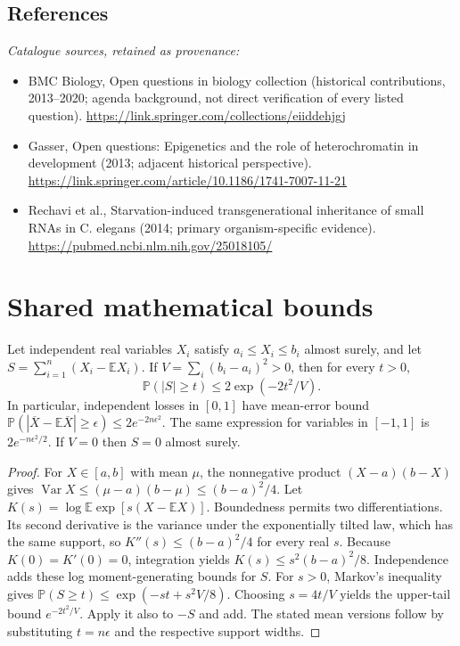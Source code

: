\documentclass[11pt]{article}
\begin{document}
\subsection{References}
\noindent\emph{Catalogue sources, retained as provenance:}
\begin{itemize}
\item BMC Biology, Open questions in biology collection (historical contributions, 2013--2020; agenda background, not direct verification of every listed question). \url{https://link.springer.com/collections/eiiddehjgj}
\item Gasser, Open questions: Epigenetics and the role of heterochromatin in development (2013; adjacent historical perspective). \url{https://link.springer.com/article/10.1186/1741-7007-11-21}
\item Rechavi et al., Starvation-induced transgenerational inheritance of small RNAs in C. elegans (2014; primary organism-specific evidence). \url{https://pubmed.ncbi.nlm.nih.gov/25018105/}
\end{itemize}




\section{Shared mathematical bounds}\label{app:bounds}
\begin{lemma}\label{lem:bounded}
Let independent real variables $X_i$ satisfy $a_i\leq X_i\leq b_i$ almost surely,
and let $S=\sum_{i=1}^n(X_i-\mathbb{E} X_i)$. If
$V=\sum_i(b_i-a_i)^2>0$, then for every $t>0$,
\[
 \mathbb{P}(|S|\geq t)\leq 2\exp(-2t^2/V).
\]
In particular, independent losses in $[0,1]$ have mean-error bound
$\mathbb{P}(|\overline X-\mathbb{E}\overline X|\geq\epsilon)
\leq2e^{-2n\epsilon^2}$. The same expression for variables in $[-1,1]$
is $2e^{-n\epsilon^2/2}$. If $V=0$ then $S=0$ almost surely.
\end{lemma}
\begin{proof}
For $X\in[a,b]$ with mean $\mu$, the nonnegative product
$(X-a)(b-X)$ gives
$\operatorname{Var} X\leq(\mu-a)(b-\mu)\leq(b-a)^2/4$.
Let $K(s)=\log\mathbb{E}\exp[s(X-\mathbb{E} X)]$.
Boundedness permits two differentiations. Its second derivative is the variance
under the exponentially tilted law, which has the same support, so
$K''(s)\leq(b-a)^2/4$ for every real $s$.
Because $K(0)=K'(0)=0$, integration yields
$K(s)\leq s^2(b-a)^2/8$.
Independence adds these log moment-generating bounds for $S$.
For $s>0$, Markov's inequality gives
$\mathbb{P}(S\geq t)\leq\exp(-st+s^2V/8)$.
Choosing $s=4t/V$ yields the upper-tail bound $e^{-2t^2/V}$.
Apply it also to $-S$ and add. The stated mean versions follow by substituting
$t=n\epsilon$ and the respective support widths.
\end{proof}
\end{document}
